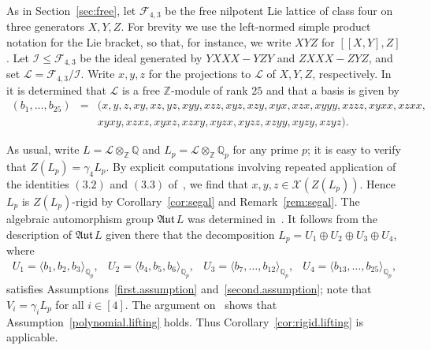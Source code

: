 \documentclass[11pt,a4paper]{amsart}
\theoremstyle{plain}
\theoremstyle{remark}
\newcommand{\Z}{\mathbb{Z}}
\newcommand{\Q}{\mathbb{Q}}
\newcommand{\tensor}{\otimes}
\def \aAut {\mathfrak{Aut} \,}
\begin{document}
As in Section~\ref{sec:free}, let $\mathcal{F}_{4,3}$ be the free nilpotent Lie lattice of class four on three generators $X,Y,Z$.  For brevity we use the left-normed simple product notation for the Lie bracket, so that, for instance, we write $XYZ$ for $[[X,Y],Z]$.  Let $\mathcal{I} \leq \mathcal{F}_{4,3}$ be the ideal generated by $YXXX - YZY$ and $ZXXX - ZYZ$, and set $\mathcal{L} = \mathcal{F}_{4,3} / \mathcal{I}$.  Write $x,y,z$ for the projections to $\mathcal{L}$ of $X,Y,Z$, respectively.  In~\cite[(3.4)]{BK/15} it is determined that $\mathcal{L}$ is a free $\Z$-module of rank $25$ and that a basis is given by 
\begin{eqnarray*}
(b_1, \dots, b_{25}) & = & (x,y,z,xy,xz,yz,xyy,xzz,xyz,xzy,xyx,xzx,xyyy,xzzz,xyxx,xzxx, \\ && xyxy,xzxz,xyxz,xzxy,xyzx,xyzz,xzyy,xyzy,xzyz).
\end{eqnarray*}  

As usual, write $L = \mathcal{L} \tensor_\Z \Q$ and $L_p = \mathcal{L} \tensor_\Z \Q_p$ for any prime $p$; it is easy to verify that $Z(L_p) = \gamma_4 L_p$.  By explicit computations involving repeated application of the identities $(3.2)$ and $(3.3)$ of~\cite{BK/15}, we find that $x,y,z \in \mathcal{X}(Z(L_p))$.  Hence $L_p$ is $Z(L_p)$-rigid by Corollary~\ref{cor:segal} and Remark~\ref{rem:segal}.
The algebraic automorphism group $\aAut L$ was determined in~\cite[Theorem 4.2]{BK/15}.  It follows from the description of $\aAut L$ given there that the decomposition $L_p = U_1 \oplus U_2 \oplus U_3 \oplus U_4$, where 
$$ \begin{array}{cccc}
U_1 = \langle b_1, b_2, b_3 \rangle_{\Q_p}, & U_2 = \langle b_4, b_5, b_6 \rangle_{\Q_p}, & U_3 = \langle b_{7}, \dots, b_{12} \rangle_{\Q_p}, & U_4 = \langle b_{13}, \dots, b_{25} \rangle_{\Q_p},
\end{array}
$$
satisfies Assumptions~\ref{first.assumption} and~\ref{second.assumption}; note that $V_i = \gamma_i L_p$ for all $i \in [4]$.  The argument on~\cite[p.~505]{BK/15} shows that Assumption~\ref{polynomial.lifting} holds.  Thus Corollary~\ref{cor:rigid.lifting} is applicable.
\end{document}
